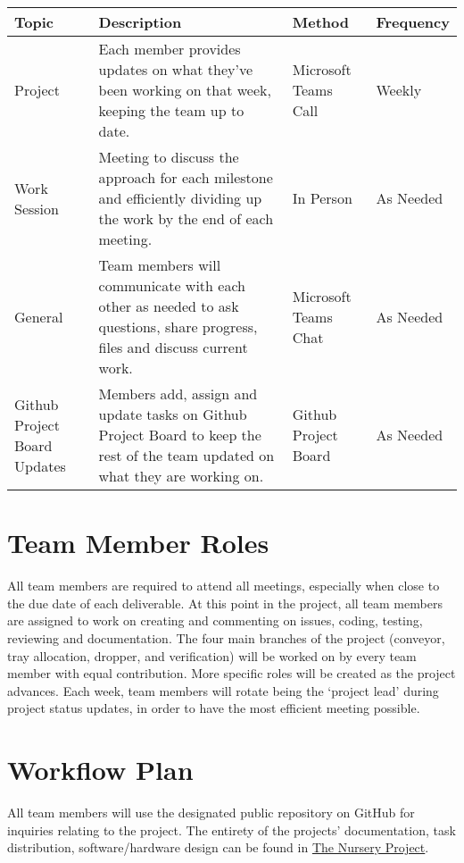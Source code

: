 \documentclass{article}
\begin{document}
	\begin{table}[hp]
		\label{crouch}
		\begin{tabular}{ p{2.4cm}  p{5 cm} p{2 cm} p{1.5 cm}}
			\toprule     
	 \textbf{Topic}   
	& \textbf{Description} 
	& \textbf{Method} 
	& \textbf{Frequency} \\\midrule
	
	 Project \vspace{ Status Updates}   
	& Each member provides updates on what they’ve been working on that week, keeping the team up to date.   
	& Microsoft Teams Call
	& Weekly\\\hline
		 
	Work Session                   
	& Meeting to discuss the approach for each milestone and efficiently dividing up the work by the end of each meeting.  
	& In Person
	& As Needed\\\hline
		  
	General \vspace {Discussion and Updates } 
	& Team members will communicate with each other as needed to ask questions, share progress, files and discuss current work.
	& Microsoft Teams Chat
	& As Needed\\\hline
	
	Github Project Board Updates       
	& Members add, assign and update tasks on Github Project Board to keep the rest of the team updated on what they are working on.
	& Github Project Board
	& As Needed\\
			\bottomrule
		\end{tabular}
	\end{table}
	\clearpage
	\section{Team Member Roles}
	All team members are required to attend all meetings, especially when close to the due date of each deliverable. At this point in the project, all team members are assigned to work on creating and commenting on issues, coding, testing, reviewing and documentation. The four main branches of the project (conveyor, tray allocation, dropper, and verification) will be worked on by every team member with equal contribution. More specific roles will be created as the project advances. Each week, team members will rotate being the ‘project lead’ during project status updates, in order to have the most efficient meeting possible. 

	\section{Workflow Plan}
	All team members will use the designated public repository on GitHub 
	for inquiries relating to the project. The entirety of the projects’ 
	documentation, task distribution, software/hardware design can be found 
	in \href{https://github.com/aaronbilly22/The_Nursery_Project}{The Nursery Project}.
	
\end{document}
